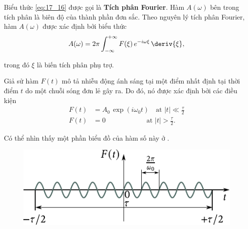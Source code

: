 \noindent
Biểu thức \eqref{eq:17_16} được gọi là \textbf{Tích phân Fourier}.
Hàm $A(\omega)$ bên trong tích phân là biên độ của thành phần đơn sắc.
Theo nguyên lý tích phân Fourier, hàm $A(\omega)$ được xác định bởi biểu thức
\begin{equation}\label{eq:17_17}
    A(\omega) = 2\pi \int_{-\infty}^{+\infty} F(\xi)\, e^{-i\omega \xi}\, \deriv{\xi},
\end{equation}

\noindent

trong đó $\xi$ là biến tích phân phụ trợ.

Giả sử hàm $F(t)$ mô tả nhiễu động ánh sáng tại một điểm nhất định tại thời điểm $t$ do một chuỗi sóng đơn lẻ gây ra.
Do đó, nó được xác định bởi các điều kiện
\begin{align*}
    F(t) &= A_0\, \exp(i \omega_0 t) \quad \text{at } |t| \ll \frac{\tau}{2} \\
    F(t) &= 0 \quad\quad\quad\quad\quad\quad\! \text{at } |t| > \frac{\tau}{2}.
\end{align*}

\noindent
Có thể nhìn thấy một phần biểu đồ của hàm số này ở .

\begin{figure}[!htb]
	\begin{center}
		\includegraphics[scale=1]{figures/ch_17/fig_17_4.pdf}
		\caption[]{}
		\label{fig:17_4}
	\end{center}
	\vspace{-0.9cm}
\end{figure}

